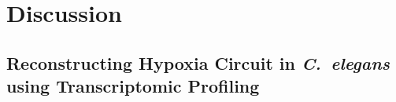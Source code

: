 \documentclass[9pt,twocolumn,twoside]{pnas-new}
\newcommand{\cel}{\emph{C.~elegans}}
\newcommand{\egl}{\emph{egl-9}}
\newcommand{\nog}{\emph{nog-1}}
\newcommand{\vhl}{\emph{vhl-1}}
\newcommand{\hif}{\emph{hif-1}}
\begin{document}
%
%
%
%

\section*{Discussion}

\subsection*{Reconstructing Hypoxia Circuit in \cel{} using Transcriptomic
            Profiling}
\end{document}
